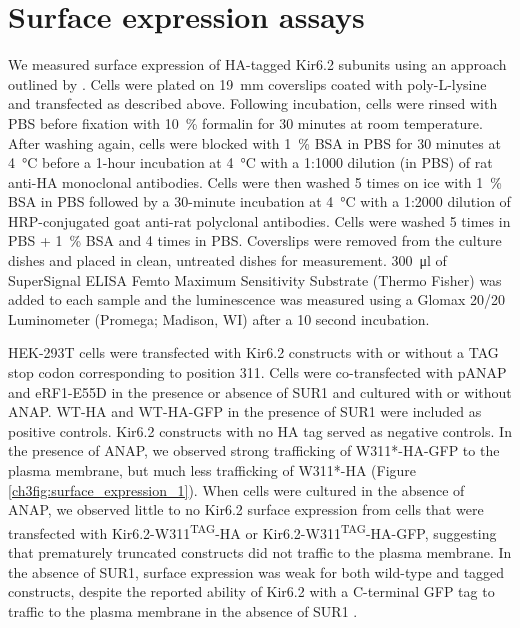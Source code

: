 \section{Surface expression assays}
We measured surface expression of HA-tagged Kir6.2 subunits using an approach outlined by \textcite{zerangue_new_1999}.
Cells were plated on \SI{19}{\milli\metre} coverslips coated with poly-L-lysine and transfected as described above.
Following incubation, cells were rinsed with PBS before fixation with \SI{10}{\percent} formalin for 30 minutes at room temperature.
After washing again, cells were blocked with \SI{1}{\percent} BSA in PBS for 30 minutes at \SI{4}{\degreeCelsius} before a 1-hour incubation at \SI{4}{\degreeCelsius} with a 1:1000 dilution (in PBS) of rat anti-HA monoclonal antibodies.
Cells were then washed 5 times on ice with \SI{1}{\percent} BSA in PBS followed by a 30-minute incubation at \SI{4}{\degreeCelsius} with a 1:2000 dilution of HRP-conjugated goat anti-rat polyclonal antibodies.
Cells were washed 5 times in PBS + \SI{1}{\percent} BSA and 4 times in PBS.
Coverslips were removed from the culture dishes and placed in clean, untreated dishes for measurement.
\SI{300}{\micro\litre} of SuperSignal ELISA Femto Maximum Sensitivity Substrate (Thermo Fisher) was added to each sample and the luminescence was measured using a Glomax 20/20 Luminometer (Promega; Madison, WI) after a 10 second incubation.

HEK-293T cells were transfected with Kir6.2 constructs with or without a TAG stop codon corresponding to position 311.
Cells were co-transfected with pANAP and eRF1-E55D in the presence or absence of SUR1 and cultured with or without ANAP.
WT-HA and WT-HA-GFP in the presence of SUR1 were included as positive controls.
Kir6.2 constructs with no HA tag served as negative controls.
In the presence of ANAP, we observed strong trafficking of W311*-HA-GFP to the plasma membrane, but much less trafficking of W311*-HA (Figure \ref{ch3fig:surface_expression_1}).
When cells were cultured in the absence of ANAP, we observed little to no Kir6.2 surface expression from cells that were transfected with Kir6.2-W311\textsuperscript{TAG}-HA or Kir6.2-W311\textsuperscript{TAG}-HA-GFP, suggesting that prematurely truncated constructs did not traffic to the plasma membrane.
In the absence of SUR1, surface expression was weak for both wild-type and tagged constructs, despite the reported ability of Kir6.2 with a C-terminal GFP tag to traffic to the plasma membrane in the absence of SUR1 \cite{john_sulphonylurea_1998-1}.

